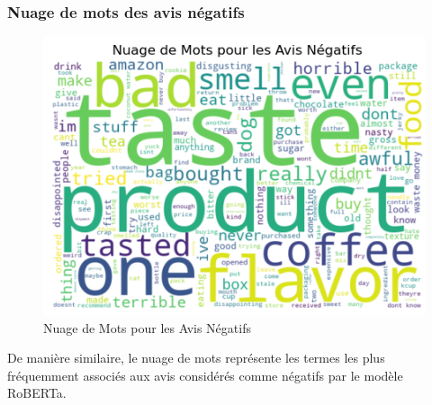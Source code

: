 \begin{frame}
    \frametitle{Nuage de mots des avis négatifs}
    \begin{figure}
        \includegraphics[scale=0.3]{Figures/wordcloudnegatif.PNG}
        \caption{Nuage de Mots pour les Avis Négatifs}
    \end{figure}
    De manière similaire, le nuage de mots représente les termes les plus fréquemment associés aux avis considérés comme négatifs par le modèle RoBERTa.
\end{frame}
